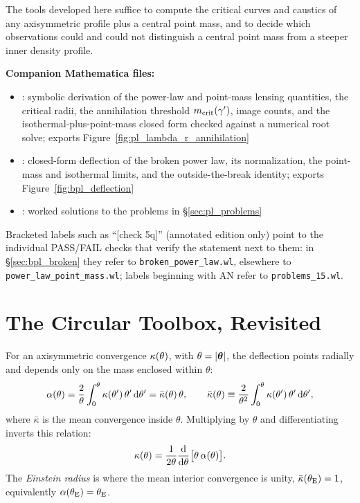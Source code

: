 The tools developed here suffice to compute the critical
curves and caustics of any axisymmetric profile plus a central point
mass, and to decide which observations could and could not distinguish
a central point mass from a steeper inner density profile.

\medskip
\noindent
\textbf{Companion Mathematica files:}
\begin{itemize}[nosep]
    \item {}:
          symbolic derivation of the power-law and point-mass
          lensing quantities, the critical radii, the annihilation
          threshold $m_{\rm crit}(\gamma')$, image counts, and the
          isothermal-plus-point-mass closed form checked against a
          numerical root solve; exports
          Figure~\ref{fig:pl_lambda_r_annihilation}
    \item {}:
          closed-form deflection of the broken power law, its
          normalization, the point-mass and isothermal limits, and the
          outside-the-break identity; exports
          Figure~\ref{fig:bpl_deflection}
    \item {}:
          worked solutions to the problems in
          \S\ref{sec:pl_problems}
\end{itemize}
\ifannotated
Bracketed labels such as ``[check 5q]'' (annotated edition only) point to the
individual PASS/FAIL checks that verify the statement next to them: in
\S\ref{sec:bpl_broken} they refer to \texttt{broken\_power\_law.wl},
elsewhere to \texttt{power\_law\_point\_mass.wl}; labels beginning
with AN refer to \texttt{problems\_15.wl}.
\fi


\section{The Circular Toolbox, Revisited}
\label{sec:pl_toolbox}

For an axisymmetric convergence $\kappa(\theta)$, with
$\theta=|\boldsymbol{\theta}|$, the deflection points radially and depends only
on the mass enclosed within $\theta$:
\begin{equation}
    \alpha(\theta) = \frac{2}{\theta}\int_0^{\theta}\kappa(\theta')\,\theta'\,\dd\theta'
                   = \bar{\kappa}(\theta)\,\theta ,
    \qquad
    \bar{\kappa}(\theta)\equiv\frac{2}{\theta^2}\int_0^{\theta}\kappa(\theta')\,\theta'\,\dd\theta' ,
    \label{eq:pl_alpha_kbar}
\end{equation}
where $\bar\kappa$ is the mean convergence inside $\theta$.  Multiplying
by $\theta$ and differentiating inverts this relation:
\begin{equation}
    \kappa(\theta) = \frac{1}{2\theta}\frac{\mathrm{d} }{\mathrm{d} \theta}\big[\theta\,\alpha(\theta)\big] .
    \label{eq:pl_kappa_inversion}
\end{equation}
The \emph{Einstein radius} is where the mean interior convergence is
unity, $\bar\kappa(\theta_{\mathrm{E}})=1$, equivalently $\alpha(\theta_{\mathrm{E}})=\theta_{\mathrm{E}}$.

